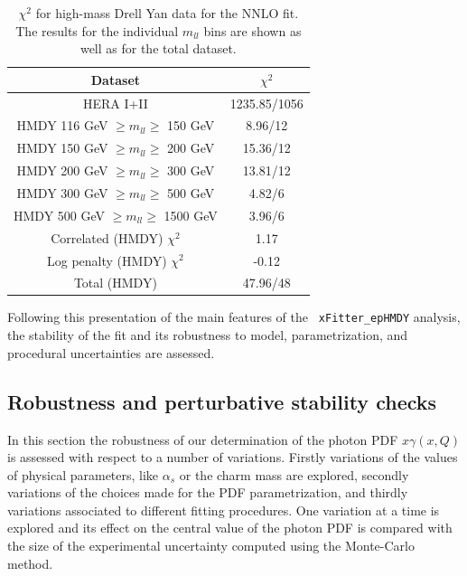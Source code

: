 \begin{table}[t]
  \centering
  \begin{tabular}{|c|c|}
    \hline
    Dataset  &   $\chi^2$ \\
    \hline
    \hline
    HERA I+II & 1235.85/1056\\
    \hline
    HMDY  116 GeV $\ge m_{ll} \ge $ 150 GeV  &  8.96/12 \\
    HMDY  150 GeV $\ge m_{ll} \ge $ 200 GeV  &  15.36/12 \\
    HMDY  200 GeV $\ge m_{ll} \ge $ 300 GeV  &  13.81/12 \\
    HMDY  300 GeV $\ge m_{ll} \ge $ 500 GeV  &  4.82/6 \\
    HMDY  500 GeV $\ge m_{ll} \ge $ 1500 GeV &  3.96/6 \\
    \hline
    Correlated (HMDY) $\chi^2$ & 1.17 \\
    Log penalty (HMDY) $\chi^2$  & -0.12 \\
    \hline
    \hline
    Total  (HMDY) & 47.96/48 \\
    \hline
    \end{tabular}
  \caption{$\chi^{2}$ for high-mass Drell Yan data for the NNLO fit.
    The results for the individual $m_{ll}$ bins are shown
    as well as for the total dataset.
\label{tab:chi2fit}
  }
\end{table}


Following this presentation of the main features of the {\tt
  xFitter\_epHMDY} analysis, the stability of the fit and its robustness
to model, parametrization, and procedural uncertainties are assessed.

\subsection{Robustness and perturbative stability checks}
\label{sec:crosschecks}

In this section the robustness of our determination of the
photon PDF $x\gamma(x,Q)$ is assessed with respect to a number of variations.
Firstly variations of the values of
physical parameters, like $\alpha_s$ or the charm mass are explored, secondly
variations of the choices made for the PDF parametrization, and thirdly 
variations associated to different fitting procedures.
%
One variation at a time is explored and its effect on the
central value of the photon PDF is compared with the size of the experimental
uncertainty computed using the Monte-Carlo method.

